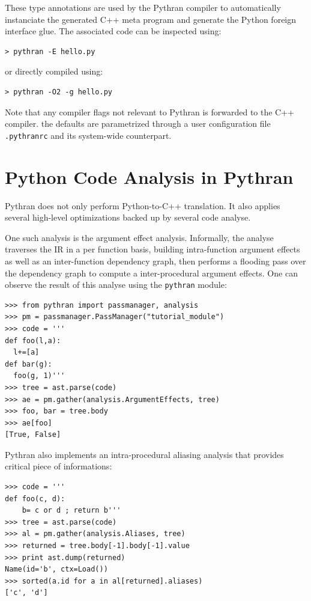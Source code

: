 \documentclass{llncs}
\begin{document}
These type annotations are used by the Pythran compiler to automatically
instanciate the generated C++ meta program and generate the Python foreign
interface glue. The associated code can be inspected using:

\begin{lstlisting}
> pythran -E hello.py
\end{lstlisting}

\noindent or directly compiled using:

\begin{lstlisting}
> pythran -O2 -g hello.py
\end{lstlisting}

Note that any compiler flags not relevant to Pythran is forwarded to the C++
compiler. the defaults are parametrized through a user configuration file
\texttt{.pythranrc} and its system-wide counterpart.

\section{Python Code Analysis in Pythran}
\label{sec:code-analyse}

Pythran does not only perform Python-to-C++ translation. It also applies
several high-level optimizations backed up by several code analyse.

One such analysis is the argument effect analysis. Informally, the analyse
traverses the \ac{IR} in a per function basis, building intra-function
argument effects as well as an inter-function dependency graph, then performs a
flooding pass over the dependency graph to compute a inter-procedural argument
effects. One can observe the result of this analyse using the \texttt{pythran} module:

\begin{lstlisting}
>>> from pythran import passmanager, analysis
>>> pm = passmanager.PassManager("tutorial_module")
>>> code = '''
def foo(l,a):
  l+=[a]
def bar(g):
  foo(g, 1)'''
>>> tree = ast.parse(code)
>>> ae = pm.gather(analysis.ArgumentEffects, tree)
>>> foo, bar = tree.body
>>> ae[foo]
[True, False]
\end{lstlisting}

Pythran also implements an intra-procedural aliasing analysis that provides
critical piece of informations:

\begin{lstlisting}
>>> code = '''
def foo(c, d):
    b= c or d ; return b'''
>>> tree = ast.parse(code)
>>> al = pm.gather(analysis.Aliases, tree)
>>> returned = tree.body[-1].body[-1].value
>>> print ast.dump(returned)
Name(id='b', ctx=Load())
>>> sorted(a.id for a in al[returned].aliases)
['c', 'd']
\end{lstlisting}
\end{document}
